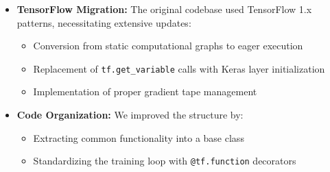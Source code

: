 \documentclass[10pt,journal,compsoc,onecolumn]{IEEEtran}
\begin{document}
\begin{itemize}
    \item \textbf{TensorFlow Migration:} The original codebase used TensorFlow 1.x patterns, necessitating extensive updates:
    \begin{itemize}
        \item Conversion from static computational graphs to eager execution
        \item Replacement of \texttt{tf.get\_variable} calls with Keras layer initialization
        \item Implementation of proper gradient tape management
    \end{itemize}
    
    \item \textbf{Code Organization:} We improved the structure by:
    \begin{itemize}
        \item Extracting common functionality into a base class
        \item Standardizing the training loop with \texttt{@tf.function} decorators
    \end{itemize}
\end{itemize}
\end{document}
